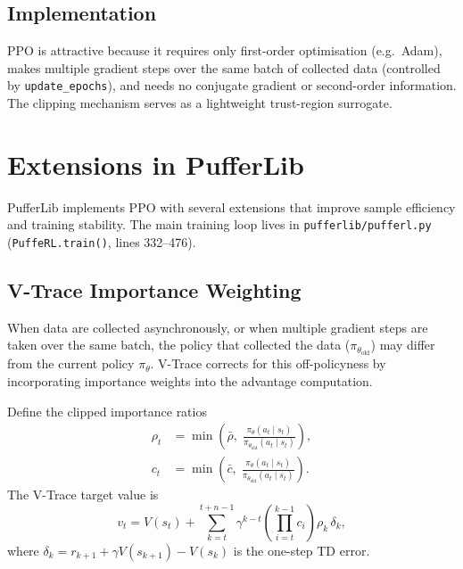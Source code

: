 \documentclass[12pt, a4paper]{article}
\theoremstyle{definition}
\theoremstyle{plain}
\theoremstyle{remark}
\newcommand{\pith}{\pi_\theta}
\newcommand{\piold}{\pi_{\theta_\mathrm{old}}}
\begin{document}
\subsection{Implementation}

PPO is attractive because it requires only first-order optimisation (e.g.\ Adam),
makes multiple gradient steps over the same batch of collected data (controlled by
\texttt{update\_epochs}), and needs no conjugate gradient or second-order information.
The clipping mechanism serves as a lightweight trust-region surrogate.

\section{Extensions in PufferLib}
\label{sec:pufferlib}

PufferLib implements PPO with several extensions that improve sample efficiency and
training stability.  The main training loop lives in
\texttt{pufferlib/pufferl.py} (\texttt{PuffeRL.train()}, lines 332--476).

\subsection{V-Trace Importance Weighting}
\label{sec:vtrace}

When data are collected asynchronously, or when multiple gradient steps are taken over
the same batch, the policy that collected the data ($\piold$) may differ from the
current policy $\pith$.  V-Trace \cite{espeholt2018impala} corrects for this
off-policyness by incorporating importance weights into the advantage computation.

Define the clipped importance ratios
\begin{align}
  \rho_t &= \min\!\left(\bar{\rho},\; \frac{\pith(a_t \mid s_t)}{\piold(a_t \mid s_t)}\right),
  \label{eq:rho}\\
  c_t    &= \min\!\left(\bar{c},\;   \frac{\pith(a_t \mid s_t)}{\piold(a_t \mid s_t)}\right).
  \label{eq:c}
\end{align}
The V-Trace target value is
\begin{equation}
  v_t = V(s_t) + \sum_{k=t}^{t+n-1} \gamma^{k-t}
        \left(\prod_{i=t}^{k-1} c_i\right) \rho_k\,
        \delta_k,
  \label{eq:vtrace_target}
\end{equation}
where $\delta_k = r_{k+1} + \gamma V(s_{k+1}) - V(s_k)$ is the one-step TD error.
\end{document}
